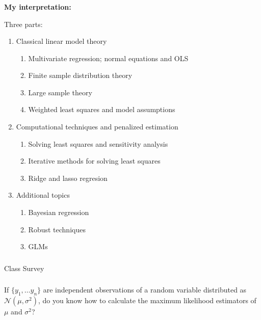 \begin{frame}[fragile] \frametitle{}

{\bf My interpretation:}

Three parts: \pause
\begin{enumerate}
\item Classical linear model theory \pause
\begin{enumerate}
\item Multivariate regression; normal equations and OLS
\item Finite sample distribution theory
\item Large sample theory
\item Weighted least squares and model assumptions \pause
\end{enumerate}
\item Computational techniques and penalized estimation \pause
\begin{enumerate}
\item Solving least squares and sensitivity analysis
\item Iterative methods for solving least squares
\item Ridge and lasso regresion \pause
\end{enumerate}
\item Additional topics \pause
\begin{enumerate}
\item Bayesian regression
\item Robust techniques
\item GLMs
\end{enumerate}
\end{enumerate}

\end{frame}

\begin{frame}[fragile] \frametitle{}

\begin{flushright}
{\color{yaleblue}\sc\fontsize{1cm}{0cm}\selectfont Class Survey}
\end{flushright}

\end{frame}

\begin{frame}[fragile] \frametitle{}

If $\{y_1, \ldots y_n \}$ are independent observations of
a random variable distributed as $\mathcal{N}(\mu, \sigma^2)$,
do you know how to calculate the maximum likelihood estimators
of $\mu$ and $\sigma^2$?

\end{frame}

